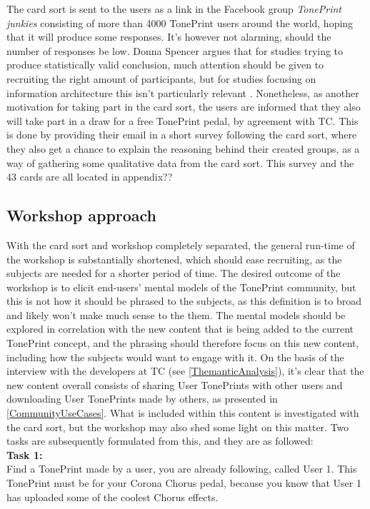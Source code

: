 The card sort is sent to the users as a link in the Facebook group \textit{TonePrint junkies} consisting of more than 4000 TonePrint users around the world, hoping that it will produce some responses. It's however not alarming, should the number of responses be low. Donna Spencer argues that for studies trying to produce statistically valid conclusion, much attention should be given to recruiting the right amount of participants, but for studies focusing on information architecture this isn't particularly relevant \parencite[][130]{WEB:DonnaSpencer}. Nonetheless, as another motivation for taking part in the card sort, the users are informed that they also will take part in a draw for a free TonePrint pedal, by agreement with TC. This is done by providing their email in a short survey following the card sort, where they also get a chance to explain the reasoning behind their created groups, as a way of gathering some qualitative data from the card sort. This survey and the 43 cards are all located in appendix?? 

\subsection{Workshop approach}
\label{WorkshopApproach}
With the card sort and workshop completely separated, the general run-time of the workshop is substantially shortened, which should ease recruiting, as the subjects are needed for a shorter period of time. The desired outcome of the workshop is to elicit end-users' mental models of the TonePrint community, but this is not how it should be phrased to the subjects, as this definition is to broad and likely won't make much sense to the them. The mental models should be explored in correlation with the new content that is being added to the current TonePrint concept, and the phrasing should therefore focus on this new content, including how the subjects would want to engage with it. On the basis of the interview with the developers at TC (see \autoref{ThemanticAnalysis}), it's clear that the new content overall consists of sharing User TonePrints with other users and downloading User TonePrints made by others, as presented in \autoref{CommunityUseCases}. What is included within this content is investigated with the card sort, but the workshop may also shed some light on this matter. Two tasks are subsequently formulated from this, and they are as followed: \\

\noindent
\textbf{Task 1:}\\
\noindent
Find a TonePrint made by a user, you are already following, called User 1. This TonePrint must be for your Corona Chorus pedal, because you know that User 1 has uploaded some of the coolest Chorus effects. \\

